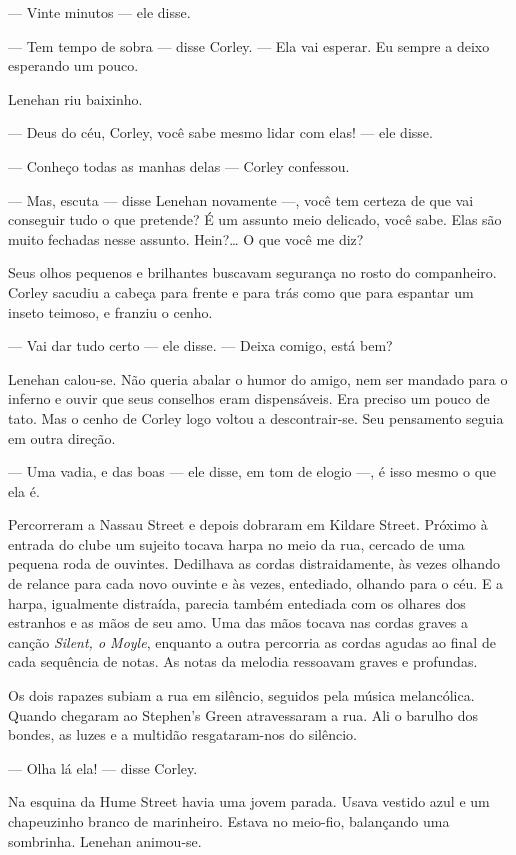 --- Vinte minutos --- ele disse.

--- Tem tempo de sobra --- disse Corley.  --- Ela vai esperar.  Eu sempre a
deixo esperando um pouco.

Lenehan riu baixinho.

--- Deus do céu, Corley, você sabe mesmo lidar com elas! --- ele disse.

--- Conheço todas as manhas delas --- Corley confessou.

--- Mas, escuta --- disse Lenehan novamente ---, você tem certeza de que vai
conseguir tudo o que pretende?  É um assunto meio delicado, você sabe.  Elas
são muito fechadas nesse assunto.  Hein?\ldots{} O que você me diz?

Seus olhos pequenos e brilhantes buscavam segurança no rosto do companheiro.
Corley sacudiu a cabeça para frente e para trás como que para espantar um
inseto teimoso, e franziu o cenho.

--- Vai dar tudo certo --- ele disse.  --- Deixa comigo, está bem?

Lenehan calou-se.  Não queria abalar o humor do amigo, nem ser mandado para o
inferno e ouvir que seus conselhos eram dispensáveis.  Era preciso um pouco de
tato.  Mas o cenho de Corley logo voltou a descontrair-se.  Seu pensamento
seguia em outra direção.

--- Uma vadia, e das boas --- ele disse, em tom de elogio ---, é isso mesmo o
que ela é.

Percorreram a Nassau Street e depois dobraram em Kildare Street.  Próximo à
entrada do clube um sujeito tocava harpa no meio da rua, cercado de uma pequena
roda de ouvintes.  Dedilhava as cordas distraidamente, às vezes olhando de
relance para cada novo ouvinte e às vezes, entediado, olhando para o céu.  E a
harpa, igualmente distraída, parecia também entediada com os olhares dos
estranhos e as mãos de seu amo.  Uma das mãos tocava nas cordas graves a canção
\textit{Silent, o Moyle}, enquanto a outra percorria as cordas agudas ao final
de cada sequência de notas.  As notas da melodia ressoavam graves e profundas.

Os dois rapazes subiam a rua em silêncio, seguidos pela música melancólica.
Quando chegaram ao Stephen’s Green atravessaram a rua.  Ali o barulho dos
bondes, as luzes e a multidão resgataram-nos do silêncio.

--- Olha lá ela! --- disse Corley.

Na esquina da Hume Street havia uma jovem parada.  Usava vestido azul e um
chapeuzinho branco de marinheiro.  Estava no meio-fio, balançando uma
sombrinha.  Lenehan animou-se.

